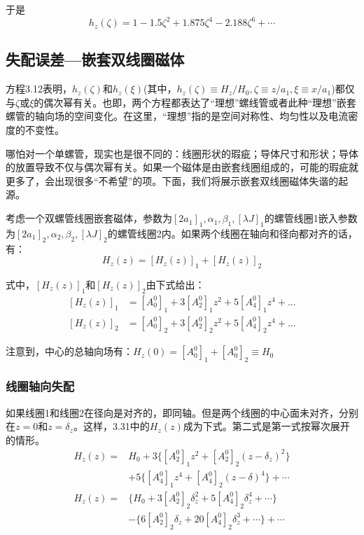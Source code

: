 于是
\begin{equation}
  h_z(\zeta)=1-1.5\zeta^2+1.875\zeta^4-2.188\zeta^6+\cdots
\end{equation}

\subsection{失配误差—嵌套双线圈磁体}
方程3.12表明，$h_z(\zeta)$和$h_z(\xi)$(其中，$h_z(\zeta)\equiv H_z/H_0,\zeta\equiv z/a_1,\xi\equiv x/a_1$)都仅与$\zeta$或$\xi$的偶次幂有关。也即，两个方程都表达了“理想”螺线管或者此种“理想”嵌套螺管的轴向场的空间变化。在这里，“理想”指的是空间对称性、均匀性以及电流密度的不变性。

哪怕对一个单螺管，现实也是很不同的：线圈形状的瑕疵；导体尺寸和形状；导体的放置导致不仅与偶次幂有关。如果一个磁体是由嵌套线圈组成的，可能的瑕疵就更多了，会出现很多“不希望”的项。下面，我们将展示嵌套双线圈磁体失谐的起源。

考虑一个双螺管线圈嵌套磁体，参数为$[2a_1]_1,\alpha_1,\beta_1,[\lambda J]_1$的螺管线圈1嵌入参数为$[2a_1]_2,\alpha_2,\beta_2,[\lambda J]_2$的螺管线圈2内。如果两个线圈在轴向和径向都对齐的话，有：
\begin{equation}
H_z(z)=[H_z(z)]_1+[H_z(z)]_2
\end{equation}

式中，$[H_z(z)]_1$和$[H_z(z)]_2$由下式给出：
\begin{subequations}
	\begin{align}
  [H_z(z)]_1 &= [A_0^0]_1 +3[A_2^0]_1 z^2+5[A_4^0]_1 z^4+... \\ 
  [H_z(z)]_2 &= [A_0^0]_2 +3[A_2^0]_2 z^2+5[A_4^0]_2 z^4+...
  \end{align}
\end{subequations}

注意到，中心的总轴向场有：$H_z(0)=[A_0^0]_1+[A_0^0]_2\equiv H_0$

\subsubsection{线圈轴向失配}
如果线圈1和线圈2在径向是对齐的，即同轴。但是两个线圈的中心面未对齐，分别在$z=0$和$z=\delta_z$。这样，3.31中的$H_z(z)$成为下式。第二式是第一式按幂次展开的情形。
\begin{subequations}
	\begin{align}
  H_z(z)=&H_0+3\{ [A_2^0]_1 z^2+[A_2^0]_2(z-\delta_z)^2\}\nonumber\\
  &+5\{[A_4^0]_1 z^4+[A_4^0]_2(z-\delta)^4\}+\cdots\\
H_z(z)=&\{H_0+3[A_2^0]_2 \delta_z^2+5[A_4^0]_2\delta_z^4+\cdots\}\nonumber\\
&-\{6[A_2^0]_2\delta_z+20[A_4^0]_2\delta_z^3+\cdots\}+\cdots
\end{align}
\end{subequations}

